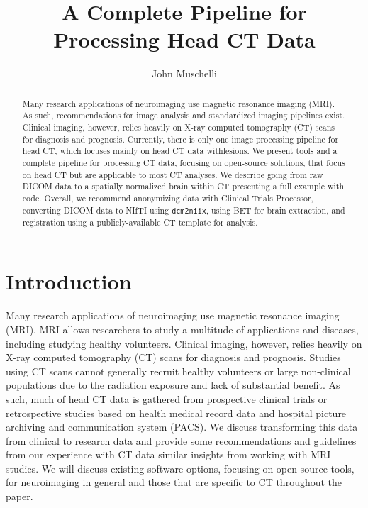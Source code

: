 \documentclass[]{elsarticle} %
\begin{document}
\begin{frontmatter}

  \title{A Complete Pipeline for Processing Head CT Data}
    \author[JHSPH]{John Muschelli}
  
      \address[JHSPH]{Johns Hopkins Bloomberg School of Public Health, Department of Biostatistics, 615 N Wolfe St, Baltimore, MD, 21205}
  
  \begin{abstract}
  Many research applications of neuroimaging use magnetic resonance imaging (MRI). As such, recommendations for image analysis and standardized imaging pipelines exist. Clinical imaging, however, relies heavily on X-ray computed tomography (CT) scans for diagnosis and prognosis. Currently, there is only one image processing pipeline for head CT, which focuses mainly on head CT data withlesions. We present tools and a complete pipeline for processing CT data, focusing on open-source solutions, that focus on head CT but are applicable to most CT analyses. We describe going from raw DICOM data to a spatially normalized brain within CT presenting a full example with code. Overall, we recommend anonymizing data with Clinical Trials Processor, converting DICOM data to NIfTI using \texttt{dcm2niix}, using BET for brain extraction, and registration using a publicly-available CT template for analysis.
  \end{abstract}
  
 \end{frontmatter}

\hypertarget{introduction}{%
\section{Introduction}\label{introduction}}

Many research applications of neuroimaging use magnetic resonance imaging (MRI). MRI allows researchers to study a multitude of applications and diseases, including studying healthy volunteers. Clinical imaging, however, relies heavily on X-ray computed tomography (CT) scans for diagnosis and prognosis. Studies using CT scans cannot generally recruit healthy volunteers or large non-clinical populations due to the radiation exposure and lack of substantial benefit. As such, much of head CT data is gathered from prospective clinical trials or retrospective studies based on health medical record data and hospital picture archiving and communication system (PACS). We discuss transforming this data from clinical to research data and provide some recommendations and guidelines from our experience with CT data similar insights from working with MRI studies. We will discuss existing software options, focusing on open-source tools, for neuroimaging in general and those that are specific to CT throughout the paper.
\end{document}
